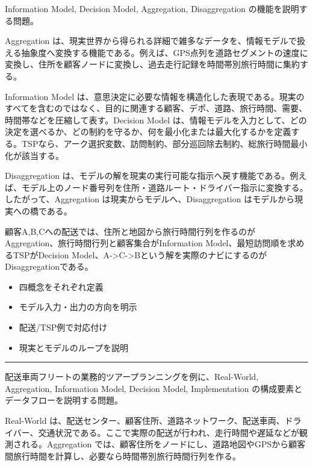 \clearpage
{}
Information Model, Decision Model, Aggregation, Disaggregation の機能を説明する問題。\par
{}
Aggregation は、現実世界から得られる詳細で雑多なデータを、情報モデルで扱える抽象度へ変換する機能である。例えば、GPS点列を道路セグメントの速度に変換し、住所を顧客ノードに変換し、過去走行記録を時間帯別旅行時間に集約する。\par
Information Model は、意思決定に必要な情報を構造化した表現である。現実のすべてを含むのではなく、目的に関連する顧客、デポ、道路、旅行時間、需要、時間帯などを圧縮して表す。Decision Model は、情報モデルを入力として、どの決定を選べるか、どの制約を守るか、何を最小化または最大化するかを定義する。TSPなら、アーク選択変数、訪問制約、部分巡回除去制約、総旅行時間最小化が該当する。\par
Disaggregation は、モデルの解を現実の実行可能な指示へ戻す機能である。例えば、モデル上のノード番号列を住所・道路ルート・ドライバー指示に変換する。したがって、Aggregation は現実からモデルへ、Disaggregation はモデルから現実への橋である。\par
{}
顧客A,B,Cへの配送では、住所と地図から旅行時間行列を作るのがAggregation、旅行時間行列と顧客集合がInformation Model、最短訪問順を求めるTSPがDecision Model、A->C->Bという解を実際のナビにするのがDisaggregationである。\par
{}
\begin{itemize}
\item 四概念をそれぞれ定義
\item モデル入力・出力の方向を明示
\item 配送/TSP例で対応付け
\item 現実とモデルのループを説明
\end{itemize}
\vspace{2mm}\hrule\vspace{2mm}
配送車両フリートの業務的ツアープランニングを例に、Real-World, Aggregation, Information Model, Decision Model, Implementation の構成要素とデータフローを説明する問題。\par
{}
Real-World は、配送センター、顧客住所、道路ネットワーク、配送車両、ドライバー、交通状況である。ここで実際の配送が行われ、走行時間や遅延などが観測される。Aggregation では、顧客住所をノードにし、道路地図やGPSから顧客間旅行時間を計算し、必要なら時間帯別旅行時間行列を作る。\par
